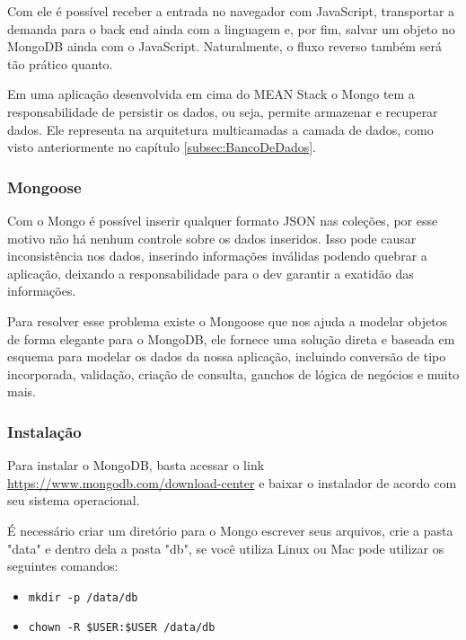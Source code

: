 \documentclass[
	12pt,				%
	openright,			%
	twoside,			%
	a4paper,			%
	english,			%
	brazil				%
	]{abntex2}
\begin{document}
Com ele é possível receber a entrada no navegador com JavaScript, transportar a demanda para o back end ainda com a linguagem e, por fim, salvar um objeto no MongoDB ainda com o JavaScript. Naturalmente, o fluxo reverso também será tão prático quanto.

Em uma aplicação desenvolvida em cima do MEAN Stack o Mongo tem a responsabilidade de persistir os dados, ou seja, permite armazenar e recuperar dados. Ele representa na arquitetura multicamadas a camada de dados, como visto anteriormente no capítulo \ref{subsec:BancoDeDados}.

\subsubsection{Mongoose}

Com o Mongo é possível inserir qualquer formato JSON nas coleções, por esse motivo não há nenhum controle sobre os dados inseridos. Isso pode causar inconsistência nos dados, inserindo informações inválidas podendo quebrar a aplicação, deixando a responsabilidade para o dev garantir a exatidão das informações.

Para resolver esse problema existe o Mongoose que nos ajuda a modelar objetos de forma elegante para o MongoDB, ele fornece uma solução direta e baseada em esquema para modelar os dados da nossa aplicação, incluindo conversão de tipo incorporada, validação, criação de consulta, ganchos de lógica de negócios e muito mais.

\subsubsection{Instalação}

Para instalar o MongoDB, basta acessar o link \url{https://www.mongodb.com/download-center} e baixar o instalador de acordo com seu sistema operacional.

É necessário criar um diretório para o Mongo escrever seus arquivos, crie a pasta "data" e dentro dela a pasta "db", se você utiliza Linux ou Mac pode utilizar os seguintes comandos:

\begin{itemize}
\item \verb|mkdir -p /data/db|
\item \verb|chown -R $USER:$USER /data/db|
\end{itemize}
\end{document}
